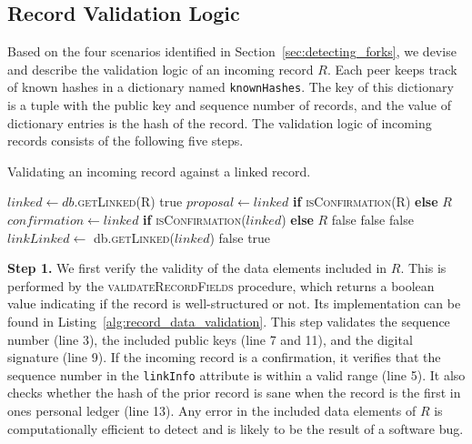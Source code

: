 \subsection{Record Validation Logic}
\label{sec:validation_logic}
Based on the four scenarios identified in Section~\ref{sec:detecting_forks}, we devise and describe the validation logic of an incoming record $ R $.
Each peer keeps track of known hashes in a dictionary named \texttt{knownHashes}.
The key of this dictionary is a tuple with the public key and sequence number of records, and the value of dictionary entries is the hash of the record.
The validation logic of incoming records consists of the following five steps.

\begin{algorithm}[t]
	\label{alg:record_validation_step3}
	\caption{Validating an incoming record against a linked record.}
	\begin{algorithmic}[1]
		  
		\State $ linked \leftarrow db $.\textsc{getLinked(R)}
		\State \Return true
		\EndIf
		\State
		\State $ proposal \leftarrow linked $ \textbf{if} \textsc{isConfirmation(R)} \textbf{else} $ R $
		\State $ confirmation \leftarrow linked $ \textbf{if} \textsc{isConfirmation($ linked $)} \textbf{else} $ R $
		\State
		\State \Return false
		\EndIf
		\State \Return false
		\EndIf
		\State \Return false
		\EndIf
		\State $ linkLinked \leftarrow $ db.\textsc{getLinked(}$ linked $\textsc{)}
		\State \Return false
		\EndIf
		\State \Return true
		\EndProcedure
	\end{algorithmic}
\end{algorithm}

\textbf{Step 1.}
We first verify the validity of the data elements included in $ R $.
This is performed by the \textsc{validateRecordFields} procedure, which returns a boolean value indicating if the record is well-structured or not.
Its implementation can be found in Listing~\ref{alg:record_data_validation}.
This step validates the sequence number (line 3), the included public keys (line 7 and 11), and the digital signature (line 9).
If the incoming record is a confirmation, it verifies that the sequence number in the \texttt{linkInfo} attribute is within a valid range (line 5).
It also checks whether the hash of the prior record is sane when the record is the first in ones personal ledger (line 13).
Any error in the included data elements of $ R $ is computationally efficient to detect and is likely to be the result of a software bug.


